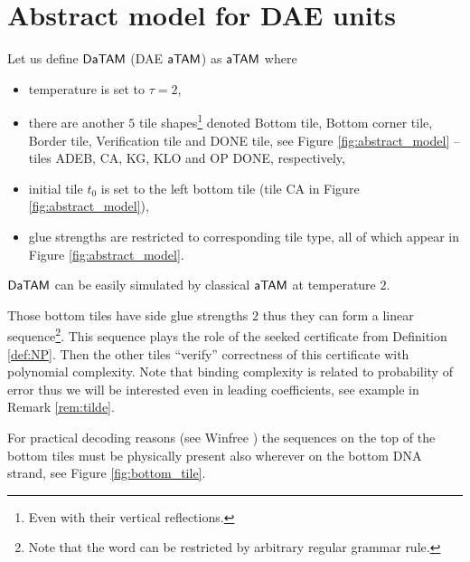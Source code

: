 \section{Abstract model for DAE units}

\begin{defn}
	Let us define $\mathsf{DaTAM}$ (DAE $\mathsf{aTAM}$) as $\mathsf{aTAM}$ where
	\begin{itemize}
		\item temperature is set to $\tau = 2$,
		\item there are another $5$ tile shapes\footnote{Even with their vertical reflections.} denoted Bottom tile, Bottom corner tile, Border tile, Verification tile and DONE tile, see Figure \ref{fig:abstract_model} -- tiles {\sf ADEB}, {\sf CA}, {\sf KG}, {\sf KLO} and {\sf OP DONE}, respectively,
		\item initial tile $t_0$ is set to the left bottom tile (tile {\sf CA} in Figure \ref{fig:abstract_model}),
		\item glue strengths are restricted to corresponding tile type, all of which appear in Figure \ref{fig:abstract_model}.
	\end{itemize}
\end{defn}

\begin{note}
	$\mathsf{DaTAM}$ can be easily simulated by classical $\mathsf{aTAM}$ at temperature $2$.
\end{note}

Those bottom tiles have side glue strengths $2$ thus they can form a linear sequence\footnote{Note that the word can be restricted by arbitrary regular grammar rule.}. This sequence plays the role of the seeked certificate from Definition \ref{def:NP}. Then the other tiles ``verify'' correctness of this certificate with polynomial complexity. Note that binding complexity is related to probability of error thus we will be interested even in leading coefficients, see example in Remark \ref{rem:tilde}.

For practical decoding reasons (see Winfree \cite{winfree_phd}) the sequences on the top of the bottom tiles must be physically present also wherever on the bottom DNA strand, see Figure \ref{fig:bottom_tile}.

